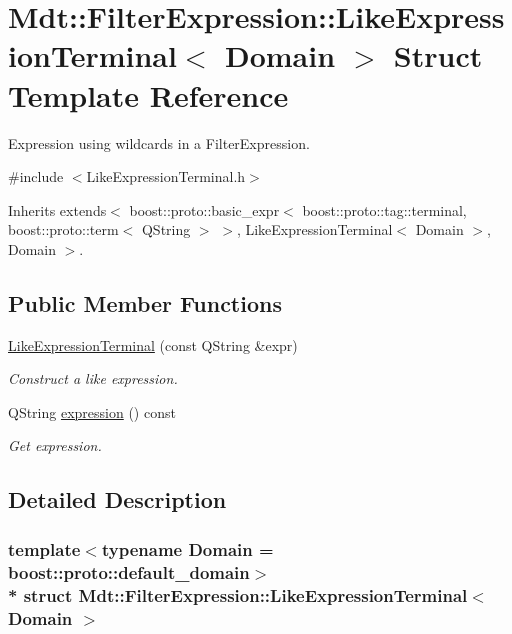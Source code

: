 \hypertarget{struct_mdt_1_1_filter_expression_1_1_like_expression_terminal}{}\section{Mdt\+:\+:Filter\+Expression\+:\+:Like\+Expression\+Terminal$<$ Domain $>$ Struct Template Reference}
\label{struct_mdt_1_1_filter_expression_1_1_like_expression_terminal}


Expression using wildcards in a Filter\+Expression.  




{\ttfamily \#include $<$Like\+Expression\+Terminal.\+h$>$}



Inherits extends$<$ boost\+::proto\+::basic\+\_\+expr$<$ boost\+::proto\+::tag\+::terminal, boost\+::proto\+::term$<$ Q\+String $>$ $>$, Like\+Expression\+Terminal$<$ Domain $>$, Domain $>$.

\subsection*{Public Member Functions}
\begin{DoxyCompactItemize}
\item 
\hyperlink{struct_mdt_1_1_filter_expression_1_1_like_expression_terminal_a75f77759b0b7105f1d7531dee40a9558}{Like\+Expression\+Terminal} (const Q\+String \&expr)
\begin{DoxyCompactList}\small\item\em Construct a like expression. \end{DoxyCompactList}\item 
Q\+String \hyperlink{struct_mdt_1_1_filter_expression_1_1_like_expression_terminal_a412c52c77b9901dc8fc1e59a42df568b}{expression} () const 
\begin{DoxyCompactList}\small\item\em Get expression. \end{DoxyCompactList}\end{DoxyCompactItemize}


\subsection{Detailed Description}
\subsubsection*{template$<$typename Domain = boost\+::proto\+::default\+\_\+domain$>$\\*
struct Mdt\+::\+Filter\+Expression\+::\+Like\+Expression\+Terminal$<$ Domain $>$}

